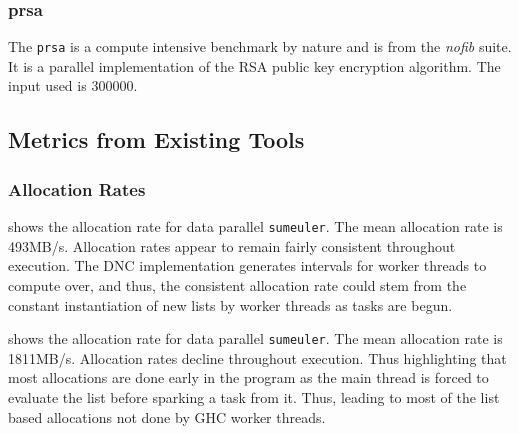 \documentclass{paper}\usepackage{graphicx}
\begin{document}
\begin{table}
  \centering
  \caption{DNC and data parallel \lstinline{sumeuler} runtimes .}
  \label{table:runtimes}
\end{table}

\subsubsection{prsa}

The \lstinline{prsa} is a compute intensive benchmark by nature and is from the \textit{nofib} suite. It is a parallel implementation of the RSA public key encryption algorithm. The input used is 300000.

\subsection{Metrics from Existing Tools}
\label{sec:alloc_metrics}

\subsubsection{Allocation Rates}
\label{sec:alloc_rates}

 shows the allocation rate for data parallel \lstinline{sumeuler}. The mean allocation rate is 493MB/s. Allocation rates appear to remain fairly consistent throughout execution. The DNC implementation generates intervals for worker threads to compute over, and thus, the consistent allocation rate could stem from the constant instantiation of new lists by worker threads as tasks are begun.

 shows the allocation rate for data parallel \lstinline{sumeuler}. The mean allocation rate is 1811MB/s. Allocation rates decline throughout execution. Thus highlighting that most allocations are done early in the program as the main thread is forced to evaluate the list before sparking a task from it. Thus, leading to most of the list based allocations not done by GHC worker threads.
\end{document}
